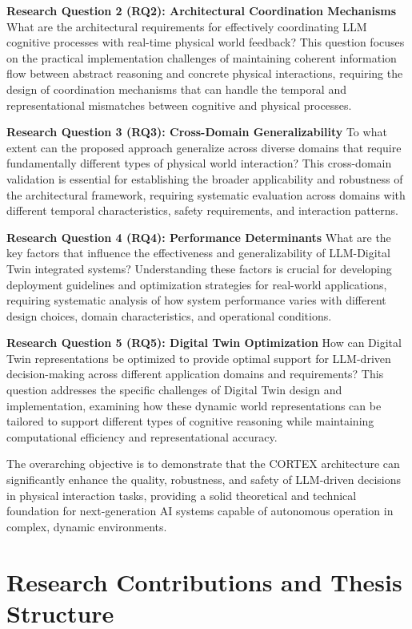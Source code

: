 \textbf{Research Question 2 (RQ2): Architectural Coordination Mechanisms}
What are the architectural requirements for effectively coordinating LLM cognitive processes with real-time physical world feedback? This question focuses on the practical implementation challenges of maintaining coherent information flow between abstract reasoning and concrete physical interactions, requiring the design of coordination mechanisms that can handle the temporal and representational mismatches between cognitive and physical processes.

\textbf{Research Question 3 (RQ3): Cross-Domain Generalizability}
To what extent can the proposed approach generalize across diverse domains that require fundamentally different types of physical world interaction? This cross-domain validation is essential for establishing the broader applicability and robustness of the architectural framework, requiring systematic evaluation across domains with different temporal characteristics, safety requirements, and interaction patterns.

\textbf{Research Question 4 (RQ4): Performance Determinants}
What are the key factors that influence the effectiveness and generalizability of LLM-Digital Twin integrated systems? Understanding these factors is crucial for developing deployment guidelines and optimization strategies for real-world applications, requiring systematic analysis of how system performance varies with different design choices, domain characteristics, and operational conditions.

\textbf{Research Question 5 (RQ5): Digital Twin Optimization}
How can Digital Twin representations be optimized to provide optimal support for LLM-driven decision-making across different application domains and requirements? This question addresses the specific challenges of Digital Twin design and implementation, examining how these dynamic world representations can be tailored to support different types of cognitive reasoning while maintaining computational efficiency and representational accuracy.

The overarching objective is to demonstrate that the CORTEX architecture can significantly enhance the quality, robustness, and safety of LLM-driven decisions in physical interaction tasks, providing a solid theoretical and technical foundation for next-generation AI systems capable of autonomous operation in complex, dynamic environments.

\section{Research Contributions and Thesis Structure}

